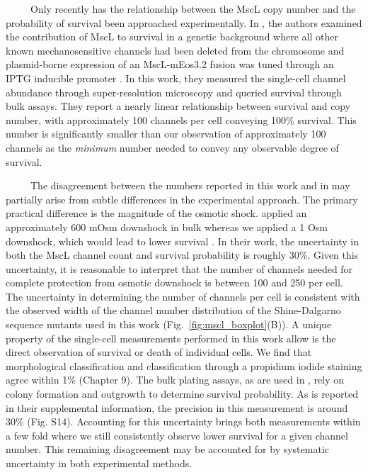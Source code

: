 \documentclass[12pt]{caltech_thesis}
\begin{document}
~~~~~Only recently has the relationship between the MscL copy number and
the probability of survival been approached experimentally. In
\textcite{vandenberg2016}, the authors examined the contribution of MscL
to survival in a genetic background where all other known
mechanosensitive channels had been deleted from the chromosome and
plasmid-borne expression of an MscL-mEos3.2 fusion was tuned through an
IPTG inducible promoter \autocite{vandenberg2016}. In this work, they
measured the single-cell channel abundance through super-resolution
microscopy and queried survival through bulk assays. They report a
nearly linear relationship between survival and copy number, with
approximately 100 channels per cell conveying 100\% survival. This
number is significantly smaller than our observation of approximately
100 channels as the \emph{minimum} number needed to convey any
observable degree of survival.

~~~~~The disagreement between the numbers reported in this work and in
\textcite{vandenberg2016} may partially arise from subtle differences in
the experimental approach. The primary practical difference is the
magnitude of the osmotic shock. \autocite{vandenberg2016} applied an
approximately 600 mOsm downshock in bulk whereas we applied a 1 Osm
downshock, which would lead to lower survival \autocite{levina1999}. In
their work, the uncertainty in both the MscL channel count and survival
probability is roughly 30\%. Given this uncertainty, it is reasonable to
interpret that the number of channels needed for complete protection
from osmotic downshock is between 100 and 250 per cell. The uncertainty
in determining the number of channels per cell is consistent with the
observed width of the channel number distribution of the Shine-Dalgarno
sequence mutants used in this work (Fig.~\ref{fig:mscl_boxplot}(B)). A
unique property of the single-cell measurements performed in this work
allow is the direct observation of survival or death of individual
cells. We find that morphological classification and classification
through a propidium iodide staining agree within 1\% (Chapter 9). The
bulk plating assays, as are used in \textcite{vandenberg2016}, rely on
colony formation and outgrowth to determine survival probability. As is
reported in their supplemental information, the precision in this
measurement is around 30\% (Fig. S14). Accounting for this uncertainty
brings both measurements within a few fold where we still consistently
observe lower survival for a given channel number. This remaining
disagreement may be accounted for by systematic uncertainty in both
experimental methods.
\end{document}

